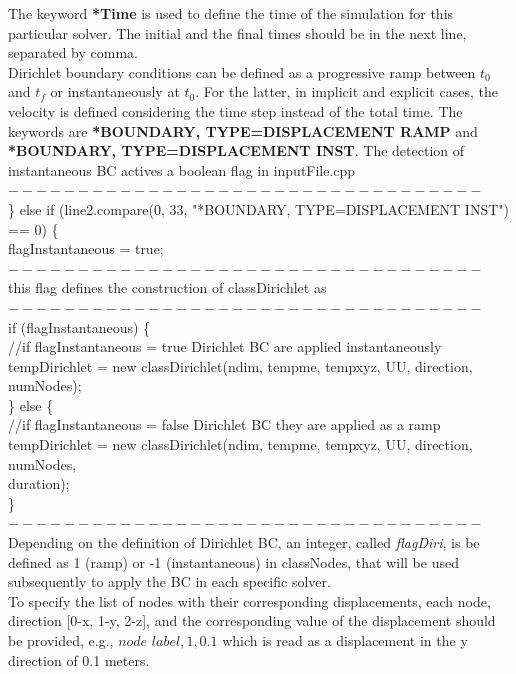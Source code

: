 \documentclass[oneside,11pt,times]{book}
\begin{document}
The keyword \textbf{*Time} is used to define the time of the simulation for this particular solver. The initial and the final times should be in the next line, separated by comma.  \\

Dirichlet boundary conditions can be defined as a progressive ramp between $t_0$ and $t_f$ or instantaneously at $t_0$. For the latter, in implicit and explicit cases, the velocity is defined considering the time step instead of the total time. The keywords are \textbf{*BOUNDARY, TYPE=DISPLACEMENT RAMP} and \textbf{*BOUNDARY, TYPE=DISPLACEMENT INST}. The detection of instantaneous BC actives a boolean flag in inputFile.cpp \\
$\bm{----------------------------------}$\\
\} else if (line2.compare(0, 33, "*BOUNDARY, TYPE=DISPLACEMENT INST") == 0) \{ \\
flagInstantaneous = true; \\
$\bm{----------------------------------}$\\
this flag defines the construction of classDirichlet as
\\
$\bm{----------------------------------}$\\
if (flagInstantaneous) \{\\
                    \hspace*{0.5cm}//if flagInstantaneous = true Dirichlet BC are applied instantaneously\\
                    \hspace*{0.5cm}tempDirichlet = new classDirichlet(ndim, tempme, tempxyz, UU, direction, numNodes);\\
                \} else \{\\
                   \hspace*{0.5cm} //if flagInstantaneous = false Dirichlet BC they are applied as a ramp\\
                   \hspace*{0.5cm} tempDirichlet = new classDirichlet(ndim, tempme, tempxyz, UU, direction, numNodes,\\ \hspace*{0.5cm} duration);\\
                \}
 \\
$\bm{----------------------------------}$\\
Depending on the definition of Dirichlet BC, an integer, called \textit{flagDiri}, is be defined as 1 (ramp) or -1 (instantaneous) in classNodes, that will be used subsequently to apply the BC in each specific solver.\\
To specify the list of nodes with their corresponding displacements, each  node, direction [0-x, 1-y, 2-z], and the corresponding value of the displacement should be provided, e.g., $node$ $label, 1, 0.1$ which is read as a displacement in the y direction of 0.1 meters.
\end{document}
